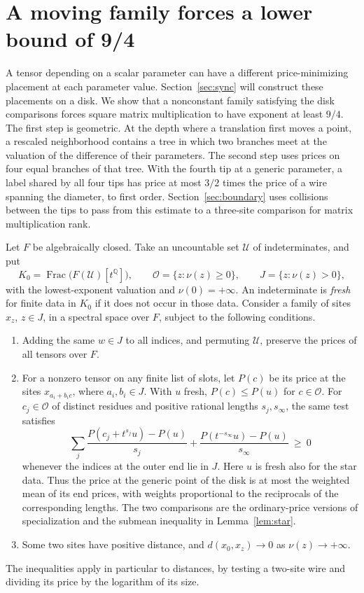 \section{A moving family forces a lower bound of 9/4}\label{sec:motion}

A tensor depending on a scalar parameter can have a different
price-minimizing placement at each parameter value.
Section~\ref{sec:sync} will construct these placements on a disk. We
show that a nonconstant family satisfying the disk comparisons forces
square matrix multiplication to have exponent at least \(9/4\). The first step is
geometric. At the depth where a translation first moves a point, a
rescaled neighborhood contains a tree in which two branches meet at
the valuation of the difference of their parameters. The second step
uses prices on four equal branches of that tree. With the fourth tip
at a generic parameter, a label shared by all four tips has price at
most \(3/2\) times the price of a wire spanning the diameter, to
first order.
Section~\ref{sec:boundary} uses collisions between the tips to pass
from this estimate to a three-site comparison for matrix multiplication rank.

Let \(F\) be algebraically closed. Take an uncountable set \(\mathcal U\)
of indeterminates, and put
\[
 K_0=\operatorname{Frac}\bigl(F(\mathcal U)[t^{\mathbb Q}]\bigr),
 \qquad \mathcal O=\{z:\nu(z)\ge0\},\qquad J=\{z:\nu(z)>0\},
\]
with the lowest-exponent valuation and \(\nu(0)=+\infty\).
An indeterminate is \emph{fresh} for finite data in \(K_0\) if it
does not occur in those data. Consider a family of sites \(x_z\),
\(z\in J\), in a spectral space over \(F\), subject to the following
conditions.
\begin{enumerate}
\item Adding the same \(w\in J\) to all indices, and permuting
  \(\mathcal U\), preserve the prices of all tensors over \(F\).
\item For a nonzero tensor on any finite list of slots, let \(P(c)\)
  be its price at the sites \(x_{a_i+b_i c}\), where \(a_i,b_i\in J\).
  With \(u\) fresh, \(P(c)\le P(u)\) for \(c\in\mathcal O\).
  For \(c_j\in\mathcal O\) of distinct residues and positive rational
  lengths \(s_j,s_\infty\), the same test satisfies
  \begin{equation}\label{eq:motion-star}
   \sum_j\frac{P(c_j+t^{s_j}u)-P(u)}{s_j}
       +\frac{P(t^{-s_\infty}u)-P(u)}{s_\infty}\ \ge\ 0
  \end{equation}
  whenever the indices at the outer end lie in \(J\). Here \(u\) is
  fresh also for the star data. Thus the price at the generic point
  of the disk is at most the weighted mean of its end prices, with
  weights proportional to the reciprocals of the corresponding
  lengths. The two comparisons are the ordinary-price versions of
  specialization and the submean inequality in Lemma~\ref{lem:star}.
\item Some two sites have positive distance, and
  \(d(x_0,x_z)\to0\) as \(\nu(z)\to+\infty\).
\end{enumerate}
The inequalities apply in particular to distances, by testing a
two-site wire and dividing its price by the logarithm of its size.

